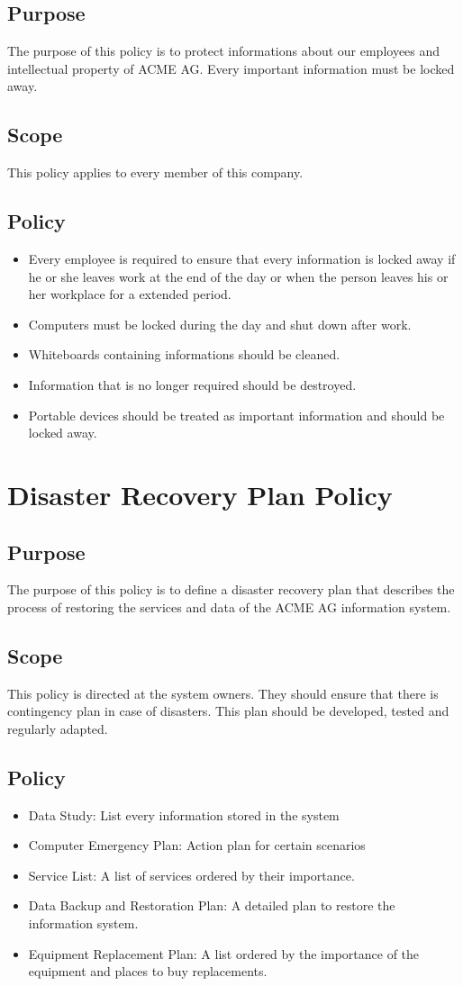 \section{Purpose}
The purpose of this policy is to protect informations about our employees and intellectual property of ACME AG. Every important information must be locked away\cite{Sans}.
\section{Scope} 
This policy applies to every member of this company.
\section{Policy}
\begin{itemize}
\item Every employee is required to ensure that every information is locked away if he or she leaves work  at the end of the day or when the person leaves his or her workplace for a extended period.
\item Computers must be locked during the day and shut down after work.
\item Whiteboards containing informations should be cleaned.
\item Information that is no longer required should be destroyed.
\item Portable devices should be treated as important information and should be locked away.
\end{itemize}
\chapter{Disaster Recovery Plan Policy}
\section{Purpose}
The purpose of this policy is to define a disaster recovery plan that describes the process of restoring the services and data of the ACME AG information system\cite{Sans}.
\section{Scope}
This policy is directed at the system owners. They should ensure that there is contingency plan in case of disasters. This plan should be developed, tested and regularly adapted\cite{Sans}.
\section{Policy}
\begin{itemize}
\item Data Study: List every information stored in the system
\item Computer Emergency Plan: Action plan for certain scenarios
\item Service List: A list of services ordered by their importance.
\item Data Backup and Restoration Plan: A detailed plan to restore the information system.
\item Equipment Replacement Plan: A list ordered by the importance of the equipment and places to buy replacements. 
\end{itemize}
